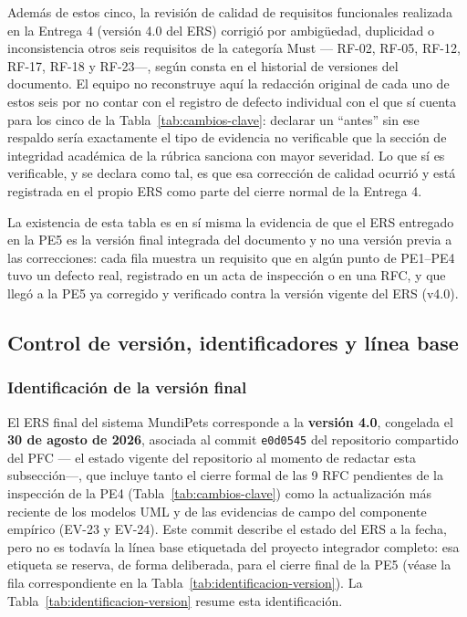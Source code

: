 \documentclass[journal,onecolumn]{IEEEtran}
\begin{document}
	Además de estos cinco, la revisión de calidad de requisitos funcionales
	realizada en la Entrega 4 (versión 4.0 del ERS) corrigió por ambigüedad,
	duplicidad o inconsistencia otros seis requisitos de la categoría Must ---
	RF-02, RF-05, RF-12, RF-17, RF-18 y RF-23---, según consta en el historial de
	versiones del documento. El equipo no reconstruye aquí la redacción original
	de cada uno de estos seis por no contar con el registro de defecto
	individual con el que sí cuenta para los cinco de la Tabla~\ref{tab:cambios-clave}:
	declarar un ``antes'' sin ese respaldo sería exactamente el tipo de
	evidencia no verificable que la sección de integridad académica de la
	rúbrica sanciona con mayor severidad. Lo que sí es verificable, y se declara
	como tal, es que esa corrección de calidad ocurrió y está registrada en el
	propio ERS como parte del cierre normal de la Entrega 4.
	
	La existencia de esta tabla es en sí misma la evidencia de que el ERS
	entregado en la PE5 es la versión final integrada del documento y no una
	versión previa a las correcciones: cada fila muestra un requisito que en
	algún punto de PE1--PE4 tuvo un defecto real, registrado en un acta de
	inspección o en una RFC, y que llegó a la PE5 ya corregido y verificado
	contra la versión vigente del ERS (v4.0).
	
	\subsection{Control de versión, identificadores y línea base}
	\label{sec:control-version}
	
	\subsubsection{Identificación de la versión final}
	
	El ERS final del sistema MundiPets corresponde a la \textbf{versión 4.0}, congelada
	el \textbf{30 de agosto de 2026}, asociada al commit \texttt{e0d0545} del
	repositorio compartido del PFC --- el estado vigente del repositorio al
	momento de redactar esta subsección---, que incluye tanto el cierre formal de
	las 9 RFC pendientes de la inspección de la PE4 (Tabla~\ref{tab:cambios-clave})
	como la actualización más reciente de los modelos UML y de las evidencias de
	campo del componente empírico (EV-23 y EV-24). Este commit describe el estado
	del ERS a la fecha, pero no es todavía la línea base etiquetada del proyecto
	integrador completo: esa etiqueta se reserva, de forma deliberada, para el
	cierre final de la PE5 (véase la fila correspondiente en la
	Tabla~\ref{tab:identificacion-version}). La Tabla~\ref{tab:identificacion-version}
	resume esta identificación.
	
\end{document}

